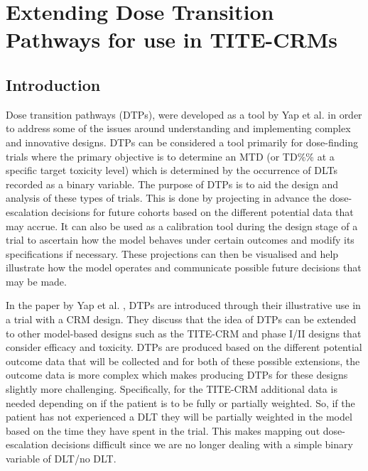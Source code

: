 
\chapter{Extending Dose Transition Pathways for use in TITE-CRMs} %

\label{TITE-DTP} %


\section{Introduction}
\label{tite-dtp:Introduction}

Dose transition pathways (DTPs), were developed as a tool by Yap et al. \cite{yapDoseTransitionPathways2017} in order to address some of the issues around understanding and implementing complex and innovative designs. DTPs can be considered a tool primarily for dose-finding trials where the primary objective is to determine an MTD (or TD\%\% at a specific target toxicity level) which is determined by the occurrence of DLTs recorded as a binary variable. The purpose of DTPs is to aid the design and analysis of these types of trials. This is done by projecting in advance the dose-escalation decisions for future cohorts based on the different potential data that may accrue. It can also be used as a calibration tool during the design stage of a trial to ascertain how the model behaves under certain outcomes and modify its specifications if necessary. These projections can then be visualised and help illustrate how the model operates and communicate possible future decisions that may be made. 

In the paper by Yap et al. \cite{yapDoseTransitionPathways2017}, DTPs are introduced through their illustrative use in a trial with a CRM design. They discuss that the idea of DTPs can be extended to other model-based designs such as the TITE-CRM and phase \RN{1}/\RN{2} designs that consider efficacy and toxicity. DTPs are produced based on the different potential outcome data that will be collected and for both of these possible extensions, the outcome data is more complex which makes producing DTPs for these designs slightly more challenging. Specifically, for the TITE-CRM additional data is needed depending on if the patient is to be fully or partially weighted. So, if the patient has not experienced a DLT they will be partially weighted in the model based on the time they have spent in the trial. This makes mapping out dose-escalation decisions difficult since we are no longer dealing with a simple binary variable of DLT/no DLT. 

